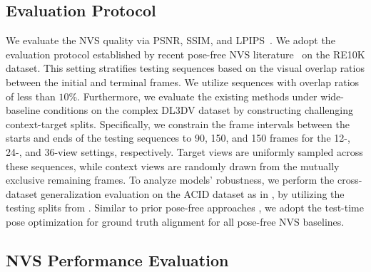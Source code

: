 \subsection{Evaluation Protocol}
We evaluate the NVS quality via PSNR, SSIM, and LPIPS~\cite{zhang2018perceptual}. We adopt the evaluation protocol established by recent pose-free NVS literature~\cite{ye2024no, huang2025no, park2026ecosplat} on the RE10K dataset. This setting stratifies testing sequences based on the visual overlap ratios between the initial and terminal frames. We utilize sequences with overlap ratios of less than $10\%$. Furthermore, we evaluate the existing methods under wide-baseline conditions on the complex DL3DV dataset by constructing challenging context-target splits. Specifically, we constrain the frame intervals between the starts and ends of the testing sequences to 90, 150, and 150 frames for the 12-, 24-, and 36-view settings, respectively. Target views are uniformly sampled across these sequences, while context views are randomly drawn from the mutually exclusive remaining frames. To analyze models' robustness, we perform the cross-dataset generalization evaluation on the ACID dataset \cite{infinite_nature_2020} as in \cite{chen2024mvsplat, huang2025no}, by utilizing the testing splits from \cite{park2026ecosplat}. Similar to prior pose-free approaches \cite{fu2024colmap, huang2025no, ye2024no,ye2026yonosplat}, we adopt the test-time pose optimization for ground truth alignment for all pose-free NVS baselines.


\subsection{NVS Performance Evaluation}

\begin{table}[t]
\begin{center}
    \scriptsize
    \caption{Quantitative comparison of NVS performance on the RE10K dataset~\cite{zhou2018stereo} under various input-view settings.  indicates the best performance. OOM indicates out-of-memory inference error.}
    \vspace{-3mm}
    \resizebox{\linewidth}{!}{ 
        
    }
\label{table:main_re10k}
\end{center}
\end{table}

